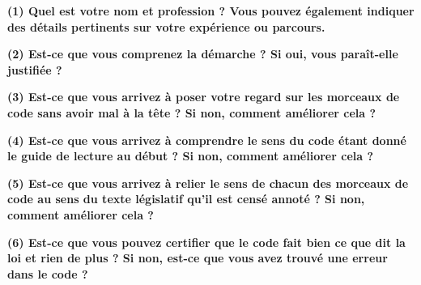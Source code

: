 \documentclass[12pt, french]{article}
\begin{document}
\label{form}
\begin{Form}
  \begin{center}
    \small
  \textbf{(1) Quel est votre nom et profession ? Vous pouvez également indiquer des détails pertinents sur votre expérience ou parcours.}\\[1em]

    \TextField[multiline=true, width=\textwidth]{}
  \end{center}
  \begin{center}
  \textbf{(2) Est-ce que vous comprenez la démarche ? Si oui, vous paraît-elle justifiée ?}\\[1em]

    \TextField[multiline=true, width=\textwidth]{}
  \end{center}
  \begin{center}
  \textbf{(3) Est-ce que vous arrivez à poser votre regard sur les morceaux de code sans avoir mal à la tête ? Si non, comment améliorer cela ?}\\[1em]

    \TextField[multiline=true, width=\textwidth]{}
  \end{center}
  \begin{center}
  \textbf{(4) Est-ce que vous arrivez à comprendre le sens du code étant donné le guide de lecture au début ? Si non, comment améliorer cela ?}\\[1em]

    \TextField[multiline=true, width=\textwidth]{}
  \end{center}
  \begin{center}
  \textbf{(5) Est-ce que vous arrivez à relier le sens de chacun des morceaux de code au sens du texte législatif qu'il est censé annoté ? Si non, comment améliorer cela ?}\\[1em]

    \TextField[multiline=true, width=\textwidth]{}
  \end{center}
  \begin{center}
  \textbf{(6) Est-ce que vous pouvez certifier que le code fait bien ce que dit la loi et rien de plus ? Si non, est-ce que vous avez trouvé une erreur dans le code ? }\\[1em]

    \TextField[multiline=true, width=\textwidth]{}
  \end{center}
\end{Form}
\end{document}
